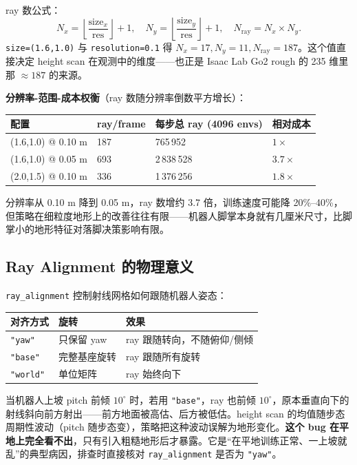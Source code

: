 ray 数公式：
\begin{equation}
N_x = \left\lfloor \frac{\text{size}_x}{\text{res}} \right\rfloor + 1,\quad
N_y = \left\lfloor \frac{\text{size}_y}{\text{res}} \right\rfloor + 1,\quad
N_{\text{ray}} = N_x \times N_y.
\label{eq:rlmc-ql-rays}
\end{equation}
\verb|size=(1.6,1.0)| 与 \verb|resolution=0.1| 得 $N_x=17, N_y=11, N_{\text{ray}}=187$。这个值直接决定 height scan 在观测中的维度——也正是 Isaac Lab Go2 rough 的 235 维里那 $\approx 187$ 的来源。

\textbf{分辨率-范围-成本权衡}（ray 数随分辨率倒数平方增长）：

\begin{center}
\small
\begin{tabular}{@{}llll@{}}
\toprule
配置 & ray/frame & 每步总 ray (4096 envs) & 相对成本 \\
\midrule
(1.6,1.0) @ 0.10 m & 187 & 765\,952 & $1\times$ \\
(1.6,1.0) @ 0.05 m & 693 & 2\,838\,528 & $3.7\times$ \\
(2.0,1.5) @ 0.10 m & 336 & 1\,376\,256 & $1.8\times$ \\
\bottomrule
\end{tabular}
\end{center}

分辨率从 0.10 m 降到 0.05 m，ray 数增约 3.7 倍，训练速度可能降 20\%--40\%，但策略在细粒度地形上的改善往往有限——机器人脚掌本身就有几厘米尺寸，比脚掌小的地形特征对落脚决策影响有限。

\subsection{Ray Alignment 的物理意义}
\label{sec:rlmc-ql-terrain-align}

\verb|ray_alignment| 控制射线网格如何跟随机器人姿态：

\begin{center}
\small
\begin{tabular}{@{}lll@{}}
\toprule
对齐方式 & 旋转 & 效果 \\
\midrule
\verb|"yaw"| & 只保留 yaw & ray 跟随转向，不随俯仰/侧倾 \\
\verb|"base"| & 完整基座旋转 & ray 跟随所有旋转 \\
\verb|"world"| & 单位矩阵 & ray 始终向下 \\
\bottomrule
\end{tabular}
\end{center}

\begin{insight}\label{ins:rlmc-ql-align}
当机器人上坡 pitch 前倾 $10^\circ$ 时，若用 \verb|"base"|，ray 也前倾 $10^\circ$，原本垂直向下的射线斜向前方射出——前方地面被高估、后方被低估。height scan 的均值随步态周期性波动（pitch 随步态变），策略把这种波动误解为地形变化。\textbf{这个 bug 在平地上完全看不出}，只有引入粗糙地形后才暴露。它是“在平地训练正常、一上坡就乱”的典型病因，排查时直接核对 \verb|ray_alignment| 是否为 \verb|"yaw"|。
\end{insight}

